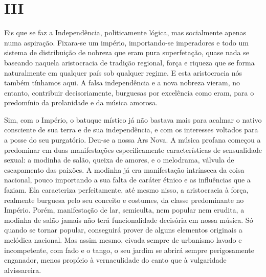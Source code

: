 \section{III}

Eis que se faz a Independência, politicamente lógica, mas socialmente
apenas numa aspiração. Fixara-se um império, importando-se imperadores e
todo um sistema de distribuição de nobreza que eram pura superfetação,
quase nada se baseando naquela aristocracia de tradição regional, força
e riqueza que se forma naturalmente em qualquer país sob qualquer
regime. E esta aristocracia nós também tínhamos aqui. A falsa
independência e a nova nobreza vieram, no entanto, contribuir
decisoriamente, burguesas por excelência como eram, para o predomínio da
prolanidade e da música amorosa.

Sim, com o Império, o batuque místico já não bastava mais para acalmar o
nativo consciente de sua terra e de sua independência, e com os
interesses voltados para a posse do seu purgatório. Deu-se a nossa Ars
Nova. A música profana começou a predominar em duas manifestações
especificamente características de sensualidade sexual: a modinha de
salão, queixa de amores, e o melodrama, válvula de escapamento das
paixões. A modinha já era manifestação intrínseca da coisa nacional,
pouco importando a sua falta de caráter étnico e as influências que a
faziam. Ela caracteriza perfeitamente, até mesmo nisso, a aristocracia à
força, realmente burguesa pelo seu conceito e costumes, da classe
predominante no Império. Porém, manifestação de lar, semiculta, nem
popular nem erudita, a modinha de salão jamais não terá funcionalidade
decisória em nossa música. Só quando se tornar popular, conseguirá
prover de alguns elementos originais a melódica nacional. Mas assim
mesmo, eivada sempre de urbanismo lavado e incompetente, com fado e o
tango, o seu jardim se abrirá sempre perigosamente enganador, menos
propício à vernaculidade do canto que à vulgaridade alvissareira.

